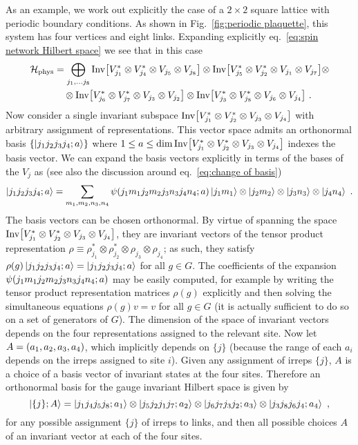 As an example, we work out explicitly the case of a $2\times 2$ square lattice with periodic boundary conditions.
As shown in Fig.~\ref{fig:periodic plaquette}, this system has four vertices and eight links.
Expanding explicitly eq.~\eqref{eq:spin network Hilbert space} we see that in this case
\begin{align}
    \mathcal{H}_{\mathrm{phys}} &= \bigoplus_{j_1, \ldots j_8}
    \mathrm{Inv}\bqty{V_{j_1}^* \otimes V_{j_4}^* \otimes V_{j_5} \otimes V_{j_8}} \otimes
    \mathrm{Inv}\bqty{V_{j_5}^* \otimes V_{j_2}^* \otimes V_{j_1} \otimes V_{j_7}}  \otimes \\
    &\quad\otimes\mathrm{Inv}\bqty{V_{j_6}^* \otimes V_{j_7}^* \otimes V_{j_3} \otimes V_{j_2}} \otimes
    \mathrm{Inv}\bqty{V_{j_3}^* \otimes V_{j_8}^* \otimes V_{j_6} \otimes V_{j_4}} \ . \nonumber
\end{align}
Now consider a single invariant subspace $\mathrm{Inv}\bqty{V_{j_1}^* \otimes V_{j_2}^* \otimes V_{j_3} \otimes V_{j_4}}$ with arbitrary assignment of representations.
This vector space admits an orthonormal basis $\{\ket{j_1 j_2 j_3 j_4 ; a}\}$ where $1 \leq a \leq \dim\mathrm{Inv}\bqty{V_{j_1}^* \otimes V_{j_2}^* \otimes V_{j_3} \otimes V_{j_4}}$ indexes the basis vector.
We can expand the basis vectors explicitly in terms of the bases of the $V_j$ as (see also the discussion around eq.~\eqref{eq:change of basis})
\begin{equation}
    \ket{j_1 j_2 j_3 j_4 ; a} = \sum_{m_1, m_2, n_3, n_4} \psi\pqty{j_1 m_1 j_2 m_2 j_3 n_3 j_4 n_4 ; a} \ket{j_1 m_1} \otimes \ket{j_2 m_2} \otimes \ket{j_3 n_3} \otimes \ket{j_4 n_4} \ .
\end{equation}
The basis vectors can be chosen orthonormal.
By virtue of spanning the space $\mathrm{Inv}\bqty{V_{j_1}^* \otimes V_{j_2}^* \otimes V_{j_3} \otimes V_{j_4}}$, they are invariant vectors of the tensor product representation $\rho \equiv \rho_{j_1}^* \otimes \rho_{j_2}^* \otimes \rho_{j_3} \otimes \rho_{j_4}$; as such, they satisfy $\rho(g) \ket{j_1 j_2 j_3 j_4 ; a} = \ket{j_1 j_2 j_3 j_4 ; a}$ for all $g \in G$.
The coefficients of the expansion $\psi\pqty{j_1 m_1 j_2 m_2 j_3 n_3 j_4 n_4 ; a}$ may be easily computed, for example by writing the tensor product representation matrices $\rho(g)$ explicitly and then solving the simultaneous equations $\rho(g) v = v$ for all $g \in G$ (it is actually sufficient to do so on a set of generators of $G$).
The dimension of the space of invariant vectors depends on the four representations assigned to the relevant site.
Now let $A = \pqty{a_1, a_2, a_3, a_4}$, which implicitly depends on $\{j\}$ (because the range of each $a_i$ depends on the irreps assigned to site $i$).
Given any assignment of irreps $\{j\}$, $A$ is a choice of a basis vector of invariant states at the four sites.
Therefore an orthonormal basis for the gauge invariant Hilbert space is given by
\begin{equation}
    \ket{ \{j\};A} = \ket{j_1 j_4 j_5 j_8 ; a_1} \otimes \ket{j_5 j_2 j_1 j_7 ; a_2} \otimes \ket{j_6 j_7 j_3 j_2 ; a_3} \otimes \ket{j_3 j_8 j_6 j_4 ; a_4} \ ,
\end{equation}
for any possible assignment $\{j\}$ of irreps to links, and then all possible choices $A$ of an invariant vector at each of the four sites.

